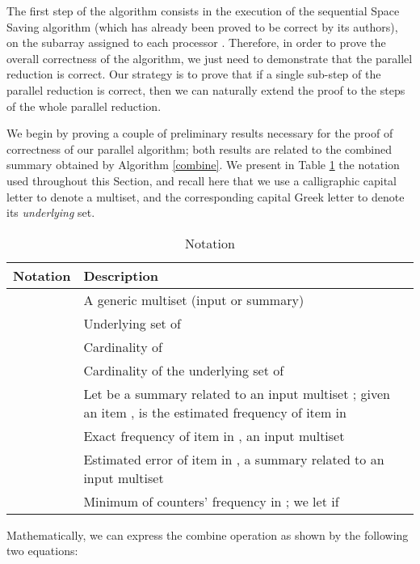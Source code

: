 \documentclass[final,3p,times]{elsarticle}
\begin{document}
The first step of the algorithm consists in the execution of the sequential Space Saving algorithm (which has already been proved to be correct by its authors),  on the subarray
assigned to each processor . Therefore, in order to prove the overall correctness of the algorithm, we just need to demonstrate that the parallel reduction is correct.
Our strategy is to prove that if a single sub-step of the parallel reduction is correct, then we can naturally extend the proof to the  steps of the whole parallel reduction.

We begin by proving a couple of preliminary results necessary for the proof of correctness of our parallel algorithm; both results are related to the combined summary  obtained by Algorithm \ref{combine}. We present in Table \ref{notation} the notation used throughout this Section, and recall here that we use a calligraphic capital letter to denote a multiset, and the corresponding capital Greek letter to denote its \textit{underlying} set.

\begin{table}
\renewcommand{\arraystretch}{1.3}
 \caption{Notation}
      \label{notation}
	\centering
    \begin{tabularx}{\textwidth}{@{} |c|X| @{}}
    \hline
    Notation & Description  \\ \hline \hline
     &  A generic multiset (input or summary) \\ \hline
     & Underlying set of    \\ \hline
     & Cardinality of  \\ \hline
     & Cardinality of the underlying set of  \\ \hline
     & Let  be a summary related to an input multiset ; given an item ,  is the estimated frequency of item  in  \\ \hline
     & Exact frequency of item  in , an input multiset\\ \hline
     & Estimated 
    error of item  in , a summary related to an input multiset \\ \hline
     & Minimum of counters' frequency in ; we let  if  \\ \hline
    \end{tabularx}
    \end{table}



Mathematically, we can express the combine operation as shown by the following two equations:
\end{document}
